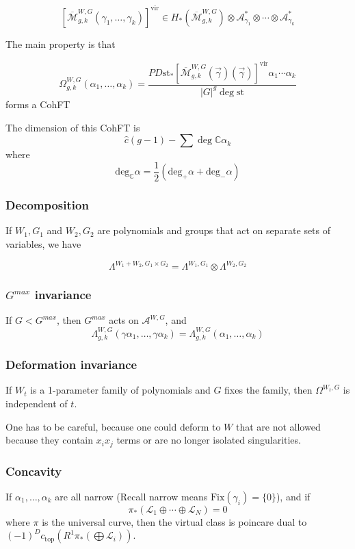 \documentclass{amsart}
\theoremstyle{definition}
\newcommand{\vir}{\text{vir}}
\newcommand{\Mbar}{\overline{\mathcal{M}}}
\newcommand{\C}{\mathbb{C}}
\newcommand{\Fix}{\text{Fix}}
\newcommand{\st}{\text{st}}
\begin{document}
$$[\Mbar^{W,G}_{g,k}(\gamma_1,\dots,\gamma_k)]^\vir\in H_*(\Mbar^{W,G}_{g,k})\otimes\mathcal{A}_{\gamma_1}^*\otimes\cdots\otimes\mathcal{A}_{\gamma_k}^*$$

The main property is that

$$\Omega^{W,G}_{g,k}(\alpha_1,\dots,\alpha_k)=\frac{PD\st_*[\Mbar^{W,G}_{g,k}(\vec{\gamma})(\vec{\gamma})]^\vir\alpha_1\cdots\alpha_k}{|G|^g\deg \st}$$
forms a CohFT

The dimension of this CohFT is $$\hat{c}(g-1)-\sum\deg\C\alpha_k$$
where $$\text{deg}_\C \alpha=\frac{1}{2}(\text{deg}_+\alpha+\text{deg}_-\alpha)$$

\subsubsection{Decomposition}
 If $W_1, G_1$ and $W_2, G_2$ are polynomials and groups that act on separate sets of variables, we have

$$\Lambda^{W_1+W_2, G_1\times G_2}=\Lambda^{W_1,G_1}\otimes\Lambda^{W_2,G_2}$$

\subsubsection{$G^{max}$ invariance}
 If $G<G^{max}$, then $G^{max}$ acts on $\mathcal{A}^{W,G}$, and
$$\Lambda^{W,G}_{g,k}(\gamma\alpha_1,\dots,\gamma\alpha_k)=\Lambda^{W,G}_{g,k}(\alpha_1,\dots,\alpha_k)$$

\subsubsection{Deformation invariance}

If $W_t$ is a 1-parameter family of polynomials and $G$ fixes the family, then $\Omega^{W_t,G}$ is independent of $t$.

One has to be careful, because one could deform to $W$ that are not allowed because they contain $x_ix_j$ terms or are no longer isolated singularities.

\subsubsection{Concavity}
If $\alpha_1,\dots,\alpha_k$ are all narrow (Recall narrow means $\Fix(\gamma_i)=\{0\}$), and if 
$$\pi_*(\mathcal{L}_1\oplus\cdots\oplus\mathcal{L}_N)=0$$
where $\pi$ is the universal curve,
then the virtual class is poincare dual to $(-1)^D c_{\text{top}}(R^1\pi_*(\bigoplus\mathcal{L}_i))$.
\end{document}

